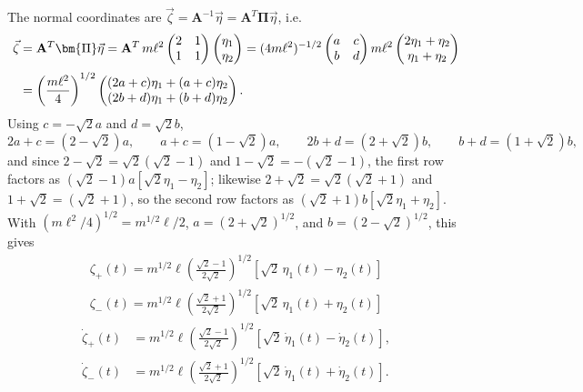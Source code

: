 \documentclass[11pt]{article}
\newcommand{\bA}{\mathbf{A}}
\newcommand{\bPi}{\bm{\Pi}}
\begin{document}
The normal coordinates are $\vec\zeta = \bA^{-1}\vec\eta = \bA^T\bPi\vec\eta$, i.e.
\begin{align}
\vec\zeta &= \bA^T\bPi\vec\eta = \bA^T\,m\ell^2\begin{pmatrix}2&1\\1&1\end{pmatrix}\begin{pmatrix}\eta_1\\\eta_2\end{pmatrix}
= (4m\ell^2)^{-1/2}\begin{pmatrix}a&c\\b&d\end{pmatrix}m\ell^2\begin{pmatrix}2\eta_1+\eta_2\\\eta_1+\eta_2\end{pmatrix}\notag\\[2pt]
&= \left(\frac{m\ell^2}{4}\right)^{1/2}\begin{pmatrix}(2a+c)\eta_1+(a+c)\eta_2\\(2b+d)\eta_1+(b+d)\eta_2\end{pmatrix}.
\end{align}
Using $c=-\sqrt2 a$ and $d=\sqrt2 b$,
\begin{equation}
2a+c=(2-\sqrt2)a, \qquad a+c=(1-\sqrt2)a, \qquad 2b+d=(2+\sqrt2)b, \qquad b+d=(1+\sqrt2)b,
\end{equation}
and since $2-\sqrt2=\sqrt2(\sqrt2-1)$ and $1-\sqrt2=-(\sqrt2-1)$, the first row factors as $(\sqrt2-1)a\left[\sqrt2\eta_1-\eta_2\right]$; likewise $2+\sqrt2=\sqrt2(\sqrt2+1)$ and $1+\sqrt2=(\sqrt2+1)$, so the second row factors as $(\sqrt2+1)b\left[\sqrt2\eta_1+\eta_2\right]$. With $(m\ell^2/4)^{1/2}=m^{1/2}\ell/2$, $a=(2+\sqrt2)^{1/2}$, and $b=(2-\sqrt2)^{1/2}$, this gives
\begin{gather}
\boxed{\zeta_+(t) = m^{1/2}\ell\left(\frac{\sqrt2-1}{2\sqrt2}\right)^{1/2}\left[\sqrt2\,\eta_1(t)-\eta_2(t)\right]}\\
\boxed{\zeta_-(t) = m^{1/2}\ell\left(\frac{\sqrt2+1}{2\sqrt2}\right)^{1/2}\left[\sqrt2\,\eta_1(t)+\eta_2(t)\right]}
\label{eq:dp-zeta}
\end{gather}
\begin{align}
\dot\zeta_+(t) &= m^{1/2}\ell\left(\frac{\sqrt2-1}{2\sqrt2}\right)^{1/2}\left[\sqrt2\,\dot\eta_1(t)-\dot\eta_2(t)\right],\\
\dot\zeta_-(t) &= m^{1/2}\ell\left(\frac{\sqrt2+1}{2\sqrt2}\right)^{1/2}\left[\sqrt2\,\dot\eta_1(t)+\dot\eta_2(t)\right].
\end{align}
\end{document}
